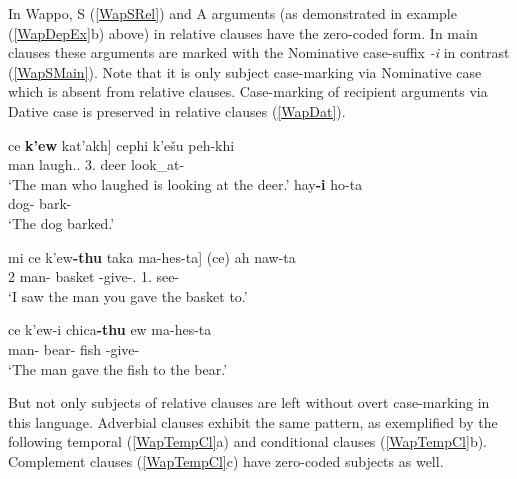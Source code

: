 In  Wappo, S (\ref{WapSRel}) and A arguments (as demonstrated in example (\ref{WapDepEx}b) above)  in relative clauses have the zero-coded form. 
In main clauses these arguments are marked with the Nominative case-suffix \emph{-i} in contrast (\ref{WapSMain}).
Note that it is only subject case-marking via Nominative case which is absent from relative clauses. 
Case-marking of recipient arguments via Dative case is preserved in relative clauses (\ref{WapDat}).

\begin{exe}\ex\label{WapRelS}
\begin{xlist} 
\ex\label{WapSRel} \gll {\rm [}ce \textbf{k'ew} kat'akh{\rm ]} cephi k'e\v su peh-khi\textglotstop\\
    \dem{} man laugh.\stat{}.\dep{} 3\sg{}.\nom{} deer look\_at-\stat{}\\
\glt `The man who laughed is looking at the deer.' %
\ex\label{WapSMain} \gll hay\textbf{-i} ho\textglotstop -ta\textglotstop\\
     dog-\nom{} bark-\pst{}\\
\glt `The dog barked.' %
\end{xlist}
\end{exe}

\enlargethispage{\baselineskip}

\begin{exe}\ex\label{WapDat}
\begin{xlist} 
\ex\label{WapDatRel}\gll  {\rm[}mi ce k'ew\textbf{-thu} {taka\textglotstop} ma-hes-ta{\rm]} (ce) ah naw-ta\textglotstop\\
2\sg{} \dem{} man-\dat{} basket \dir{}-give-\pst{}.\dep{} \dem{} 1\sg{}.\nom{} see-\pst{}\\
\glt `I saw the man you gave the basket to.' %

\ex\label{WapDatMain}\gll ce k'ew-i chica\textbf{-thu}  ew ma-hes-ta\textglotstop\\
\dem{} man-\nom{} bear-\dat{} fish \dir{}-give-\pst{}\\
\glt `The man gave the fish to the bear.' %
\end{xlist}
\end{exe}

But not only subjects of relative clauses are left without overt case-marking in this language.
Adverbial clauses exhibit the same pattern, as exemplified by the following  temporal (\ref{WapTempCl}a) and conditional clauses (\ref{WapTempCl}b). 
Complement clauses (\ref{WapTempCl}c) have zero-coded subjects as well.

